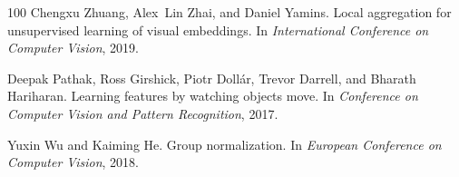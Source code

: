 \documentclass{article}
\begin{document}
{\begin{thebibliography}{100}
Chengxu Zhuang, Alex~Lin Zhai, and Daniel Yamins.
\newblock Local aggregation for unsupervised learning of visual embeddings.
\newblock In {\em International Conference on Computer Vision}, 2019.

Deepak Pathak, Ross Girshick, Piotr Doll{\'a}r, Trevor Darrell, and Bharath
  Hariharan.
\newblock Learning features by watching objects move.
\newblock In {\em Conference on Computer Vision and Pattern Recognition}, 2017.

Yuxin Wu and Kaiming He.
\newblock Group normalization.
\newblock In {\em European Conference on Computer Vision}, 2018.

\end{thebibliography}

}

\clearpage
\appendix

\end{document}
